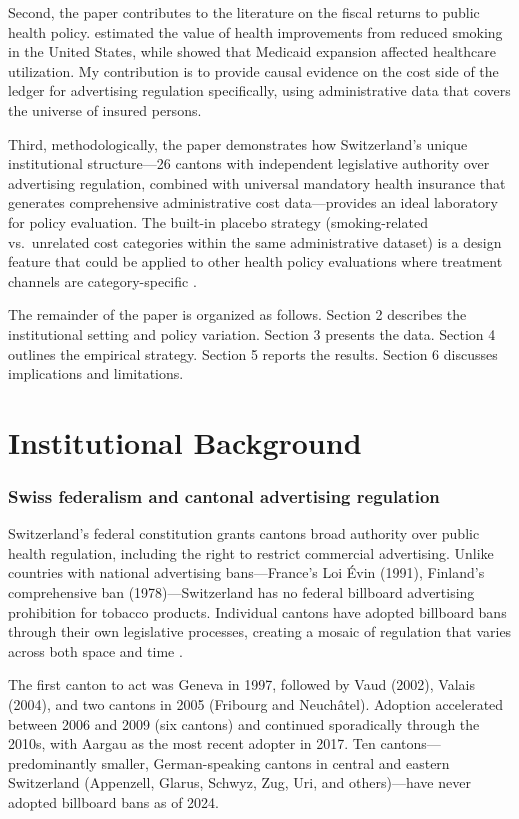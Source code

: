 \documentclass[12pt]{article}
\begin{document}
Second, the paper contributes to the literature on the fiscal returns to public health policy. \citet{cutler2006value} estimated the value of health improvements from reduced smoking in the United States, while \citet{baicker2007oregon} showed that Medicaid expansion affected healthcare utilization. My contribution is to provide causal evidence on the cost side of the ledger for advertising regulation specifically, using administrative data that covers the universe of insured persons.

Third, methodologically, the paper demonstrates how Switzerland's unique institutional structure---26 cantons with independent legislative authority over advertising regulation, combined with universal mandatory health insurance that generates comprehensive administrative cost data---provides an ideal laboratory for policy evaluation. The built-in placebo strategy (smoking-related vs.\ unrelated cost categories within the same administrative dataset) is a design feature that could be applied to other health policy evaluations where treatment channels are category-specific \citep{angrist2009mostly}.

The remainder of the paper is organized as follows. Section 2 describes the institutional setting and policy variation. Section 3 presents the data. Section 4 outlines the empirical strategy. Section 5 reports the results. Section 6 discusses implications and limitations.


\section{Institutional Background}

\subsubsection*{Swiss federalism and cantonal advertising regulation} Switzerland's federal constitution grants cantons broad authority over public health regulation, including the right to restrict commercial advertising. Unlike countries with national advertising bans---France's Loi Évin (1991), Finland's comprehensive ban (1978)---Switzerland has no federal billboard advertising prohibition for tobacco products. Individual cantons have adopted billboard bans through their own legislative processes, creating a mosaic of regulation that varies across both space and time \citep{joossens2006smoking}.

The first canton to act was Geneva in 1997, followed by Vaud (2002), Valais (2004), and two cantons in 2005 (Fribourg and Neuch\^{a}tel). Adoption accelerated between 2006 and 2009 (six cantons) and continued sporadically through the 2010s, with Aargau as the most recent adopter in 2017. Ten cantons---predominantly smaller, German-speaking cantons in central and eastern Switzerland (Appenzell, Glarus, Schwyz, Zug, Uri, and others)---have never adopted billboard bans as of 2024.
\end{document}
